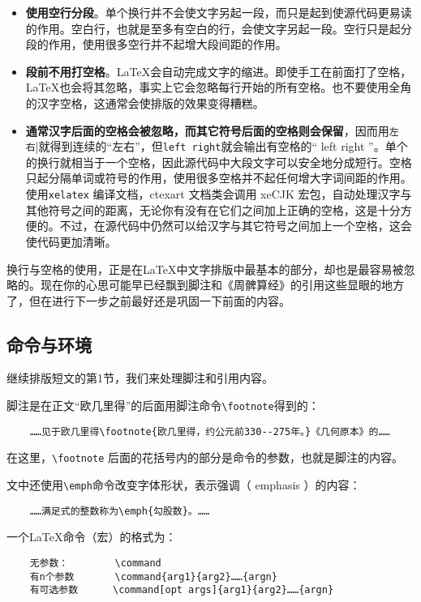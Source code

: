 \begin{itemize}
    \item \textbf{使用空行分段}。单个换行并不会使文字另起一段，而只是起到使源代码更易读的作用。空白行，也就是至多有空白的行，会使文字另起一段。空行只是起分段的作用，使用很多空行并不起增大段间距的作用。
    \item \textbf{段前不用打空格}。\LaTeX 会自动完成文字的缩进。即使手工在前面打了空格，\LaTeX 也会将其忽略，事实上它会忽略每行开始的所有空格。也不要使用全角的汉字空格，这通常会使排版的效果变得糟糕。
    \item \textbf{通常汉字后面的空格会被忽略，而其它符号后面的空格则会保留}，因而用\lstinline[showspaces=true]{左 右}|就得到连续的“左右”，但\lstinline[showspaces=true]{left right}就会输出有空格的“ left right ”。单个的换行就相当于一个空格，因此源代码中大段文字可以安全地分成短行。空格只起分隔单词或符号的作用，使用很多空格并不起任何增大字词间距的作用。使用\verb|xelatex| 编译文档，ctexart 文档类会调用 xeCJK 宏包，自动处理汉字与其他符号之间的距离，无论你有没有在它们之间加上正确的空格，这是十分方便的。不过，在源代码中仍然可以给汉字与其它符号之间加上一个空格，这会使代码更加清晰。
\end{itemize}

换行与空格的使用，正是在\LaTeX 中文字排版中最基本的部分，却也是最容易被忽略的。现在你的心思可能早已经飘到脚注和《周髀算经》的引用这些显眼的地方了，但在进行下一步之前最好还是巩固一下前面的内容。

\subsection{命令与环境} \label{sec:environment}

继续排版短文的第1节，我们来处理脚注和引用内容。

脚注是在正文“欧几里得”的后面用脚注命令\verb|\footnote|得到的：
\begin{lstlisting}
    ……见于欧几里得\footnote{欧几里得，约公元前330--275年。}《几何原本》的……
\end{lstlisting}
在这里，\verb|\footnote| 后面的花括号内的部分是命令的参数，也就是脚注的内容。

文中还使用\verb|\emph|命令改变字体形状，表示强调（ emphasis ）的内容：
\begin{lstlisting}
    ……满足式的整数称为\emph{勾股数}。……
\end{lstlisting}

一个\LaTeX 命令（宏）的格式为：
\begin{lstlisting}
    无参数：        \command
    有n个参数       \command{arg1}{arg2}……{argn}
    有可选参数      \command[opt args]{arg1}{arg2}……{argn}
\end{lstlisting}

